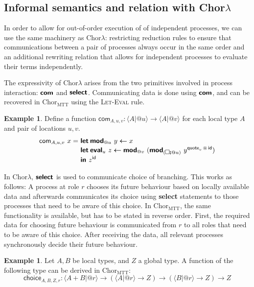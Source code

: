 \documentclass{scrartcl}
\theoremstyle{definition}
\newtheorem{example}[definition]{Example}
\theoremstyle{plain}
\renewcommand{\square}%
  {\tikz{\draw (0,0) rectangle (0.2cm,0.2cm);}}
\newcommand{\primitive}[1]{\textsf{\textbf{#1}}}
\newcommand{\ChorMTT}{Chor${}_{\textrm{MTT}}$}
\begin{document}
\subsection{Informal semantics and relation with
  \texorpdfstring{Chor$\lambda$}{ChorLambda}}
In order to allow for out-of-order execution of of independent processes, we
can use the same machinery as Chor$\lambda$: restricting reduction rules to
ensure that communications between a pair of processes always occur in the same
order and an additional rewriting relation that allows for independent
processes to evaluate their terms independently.

The expressivity of Chor$\lambda$ arises from the two primitives involved in
process interaction: $\primitive{com}$ and $\primitive{select}$. Communicating
data is done using $\primitive{com}$, and can be recovered in \ChorMTT{} using
the \textsc{Let-Eval} rule.
\begin{example}
  Define a function $\textsf{com}_{A,u,v} : \langle A | @u
  \rangle \to \langle A | @v \rangle$ for each local type $A$ and pair of
  locations $u,v$.
  \begin{align*}
    \textsf{com}_{A,u,v}\ x =
    \ & \primitive{let}\:\primitive{mod}_{@u}\ y \bm{\leftarrow} x\\[-3pt]
      & \primitive{let}\:\primitive{eval}_u\ z \bm{\leftarrow} \primitive{mod}_{@v}\ (\primitive{mod}_{(\square \fatsemi @u)}\ 
        y^{\textsf{quote}_v \,\circledast\, \textsf{id}})\\[-3pt]
      & \primitive{in } z^{\textsf{id}}
  \end{align*}
\end{example}
In Chor$\lambda$, $\primitive{select}$ is used to communicate choice of
branching. This works as follows: A process at role $r$ chooses its future
behaviour based on locally available data and afterwards communicates its
choice using \primitive{select} statements to those processes that need to be
aware of this choice. In \ChorMTT{}, the same functionality is available, but
has to be stated in reverse order. First, the required data for choosing future
behaviour is communicated from $r$ to all roles that need to be aware of this
choice. After receiving the data, all relevant processes synchronously decide
their future behaviour.
\begin{example}
  Let $A, B$ be local types, and $Z$ a global type. A function of the following
  type can be derived in \ChorMTT:
  \[
    \textsf{choice}_{A,B,Z,r} : \langle A + B | @r \rangle
    \to (\langle A | @r \rangle \to Z)
    \to (\langle B | @r \rangle \to Z)
    \to Z
  \]
\end{example}
\end{document}
